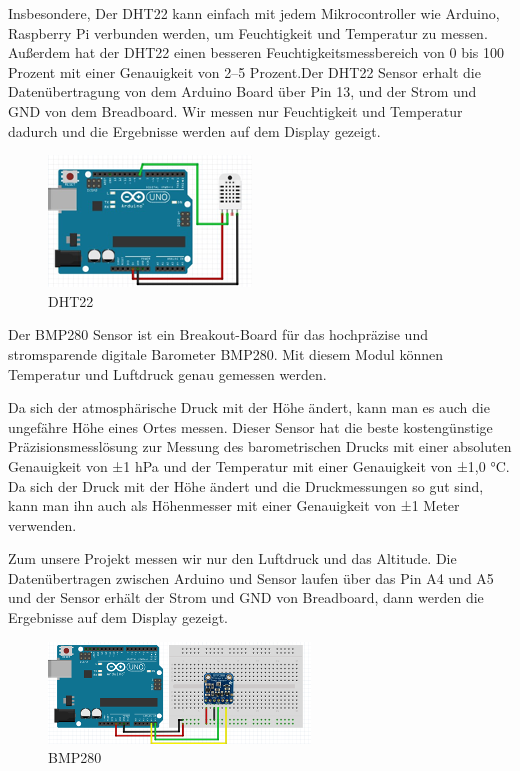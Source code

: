 \documentclass[conference]{IEEEtran}
\begin{document}
Insbesondere, Der DHT22 kann einfach mit jedem Mikrocontroller wie Arduino, Raspberry Pi verbunden werden, um Feuchtigkeit und Temperatur zu messen. Außerdem hat der DHT22 einen besseren Feuchtigkeitsmessbereich von 0 bis 100 Prozent mit einer Genauigkeit von 2–5 Prozent.Der DHT22 Sensor erhalt die Datenübertragung von dem Arduino Board über Pin 13, und der Strom und GND von dem Breadboard.  Wir messen nur Feuchtigkeit und Temperatur dadurch und die Ergebnisse werden auf dem Display gezeigt. 


\begin{figure} [h]
	\centering
	\includegraphics[width=0.7\linewidth]{fig27}
	\caption{DHT22}
	\label{fig:fig27}
\end{figure}




Der  BMP280 Sensor ist ein Breakout-Board für das hochpräzise und stromsparende digitale Barometer BMP280. Mit diesem Modul können Temperatur und Luftdruck genau gemessen werden. 

Da sich der atmosphärische Druck mit der Höhe ändert, kann man es auch die ungefähre Höhe eines Ortes messen.
Dieser Sensor hat die beste kostengünstige Präzisionsmesslösung zur Messung des barometrischen Drucks mit einer absoluten Genauigkeit von ±1 hPa und der Temperatur mit einer Genauigkeit von ±1,0 °C. Da sich der Druck mit der Höhe ändert und die Druckmessungen so gut sind, kann man ihn auch als Höhenmesser mit einer Genauigkeit von ±1 Meter verwenden.

Zum unsere Projekt messen wir nur den Luftdruck und das Altitude. Die Datenübertragen zwischen Arduino und Sensor laufen über das Pin A4 und A5 und der Sensor erhält der Strom und GND von Breadboard, dann werden die Ergebnisse auf dem Display gezeigt. 

\begin{figure} [h]
	\centering
	\includegraphics[width=0.8\linewidth]{fig28}
	\caption{BMP280}
	\label{fig:fig28}
\end{figure}
\end{document}

